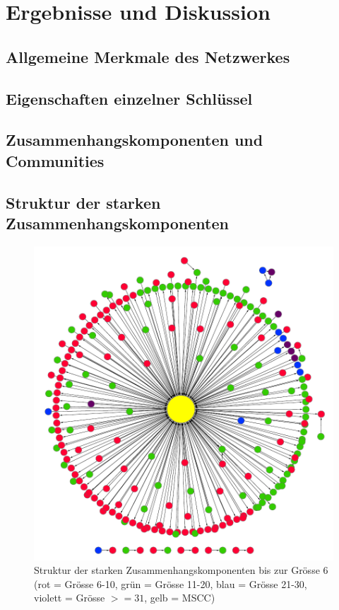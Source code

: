 
\chapter{Ergebnisse und Diskussion}
\label{ch:Ergebnisse}

\section{Allgemeine Merkmale des Netzwerkes}
\label{sec:result-allg-merkm-des}

\section{Eigenschaften einzelner Schl\"ussel}
\label{sec:result-key-properties}

\section{Zusammenhangskomponenten und Communities}
\label{sec:result-zusamm-und-comm}

\section{Struktur der starken Zusammenhangskomponenten}
\label{sec:result-komponentenstruktur}

\begin{figure}[t]
  \centering
  \includegraphics[scale=1.0]{images/component-metagraph-8.pdf}
  \caption{Struktur der starken Zusammenhangskomponenten bis zur
    Grösse 6 (rot = Grösse 6-10, grün = Grösse 11-20, blau = Grösse
    21-30, violett = Grösse $>= 31$, gelb = MSCC)}
  \label{fig:komponenten-struktur}
\end{figure}

